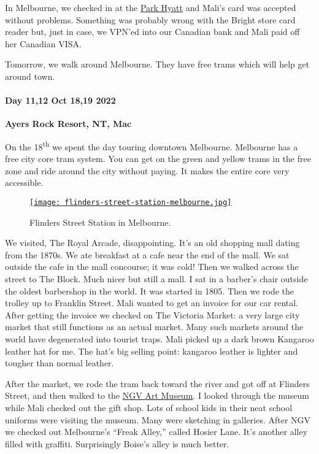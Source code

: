 In Melbourne, we checked in at the
\href{https://www.hyatt.com/en-US/hotel/australia/park-hyatt-melbourne/melph}{Park
Hyatt} and Mali's card was accepted without problems. Something was
probably wrong with the Bright store card reader but, just in case, we
VPN'ed into our Canadian bank and Mali paid off her Canadian VISA.

Tomorrow, we walk around Melbourne. They have free trams which will help
get around town.

\hypertarget{day-1112-oct-1819-2022}{%
\paragraph{\texorpdfstring{\textbf{Day 11,12 Oct 18,19 2022}}{Day 11,12 Oct 18,19 2022}}\label{day-1112-oct-1819-2022}}


\textbf{Ayers Rock Resort, NT, Mac}

On the 18\textsuperscript{th} we spent the day touring downtown
Melbourne. Melbourne has a free city core tram system. You can get on
the green and yellow trams in the free zone and ride around the city
without paying. It makes the entire core very accessible.


\captionsetup[figure]{labelformat=empty}
\begin{SCfigure}[10]
\centering
\href{https://conceptcontrol.smugmug.com/Trips/Overseas/Australia-New-Zealand-2022/i-gzRJZgc/A}{\texttt{[image: flinders-street-station-melbourne.jpg]}}
\caption[Flinders Street Station in Melbourne]{Flinders Street Station in Melbourne.}
\label{fig:7573x1}
\end{SCfigure}

We visited, The Royal Arcade, disappointing. It's an old shopping mall
dating from the 1870s. We ate breakfast at a cafe near the end of the
mall. We sat outside the cafe in the mall concourse; it was cold! Then
we walked across the street to The Block. Much nicer but still a mall. I
sat in a barber's chair outside the oldest barbershop in the world. It
was started in 1805. Then we rode the trolley up to Franklin Street.
Mali wanted to get an invoice for our car rental. After getting the
invoice we checked on The Victoria Market: a very large city market that
still functions as an actual market. Many such markets around the world
have degenerated into tourist traps. Mali picked up a dark brown
Kangaroo leather hat for me. The hat's big selling point: kangaroo
leather is lighter and tougher than normal leather.

After the market, we rode the tram back toward the river and got off at
Flinders Street, and then walked to the
\href{https://www.ngv.vic.gov.au/}{NGV Art Museum}. I looked through the
museum while Mali checked out the gift shop. Lots of school kids in
their neat school uniforms were visiting the museum. Many were sketching
in galleries. After NGV we checked out Melbourne's ``Freak Alley,''
called Hosier Lane. It's another alley filled with graffiti.
Surprisingly Boise's alley is much better.

